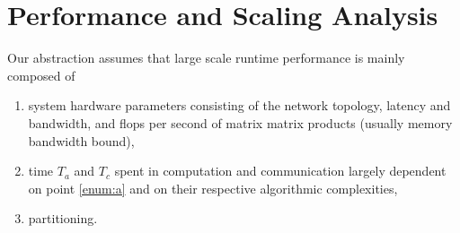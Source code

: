 \documentclass{sig-alternate}
\begin{document}



\section{Performance and Scaling Analysis}
\label{sec:analysis}
Our abstraction assumes that large scale runtime performance is mainly composed
of
\begin{enumerate}
  \item system hardware parameters consisting of the network topology, latency and
    bandwidth\label{enum:a}, and flops per second of matrix matrix products
    (usually memory bandwidth bound), 
  \item time $T_a$ and $T_c$ spent in computation and communication largely
    dependent on point \ref{enum:a} and on their respective algorithmic complexities,
  \item partitioning.\label{enum:c}
\end{enumerate}
\end{document}
